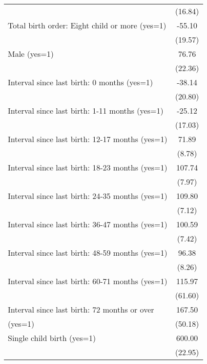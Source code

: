 {\begin{tabular}{l*{1}{c}}
                                                  &     (16.84)\\
Total birth order: Eight child or more (yes=1)    &      -55.10\\
                                                  &     (19.57)\\
Male (yes=1)                                      &       76.76\\
                                                  &     (22.36)\\
Interval since last birth: 0 months (yes=1)       &      -38.14\\
                                                  &     (20.80)\\
Interval since last birth: 1-11 months (yes=1)    &      -25.12\\
                                                  &     (17.03)\\
Interval since last birth: 12-17 months (yes=1)   &       71.89\\
                                                  &      (8.78)\\
Interval since last birth: 18-23 months (yes=1)   &      107.74\\
                                                  &      (7.97)\\
Interval since last birth: 24-35 months (yes=1)   &      109.80\\
                                                  &      (7.12)\\
Interval since last birth: 36-47 months (yes=1)   &      100.59\\
                                                  &      (7.42)\\
Interval since last birth: 48-59 months (yes=1)   &       96.38\\
                                                  &      (8.26)\\
Interval since last birth: 60-71 months (yes=1)   &      115.97\\
                                                  &     (61.60)\\
Interval since last birth: 72 months or over      &      167.50\\
(yes=1)                                           &     (50.18)\\
Single child birth (yes=1)                        &      600.00\\
                                                  &     (22.95)\\

\end{tabular}}
